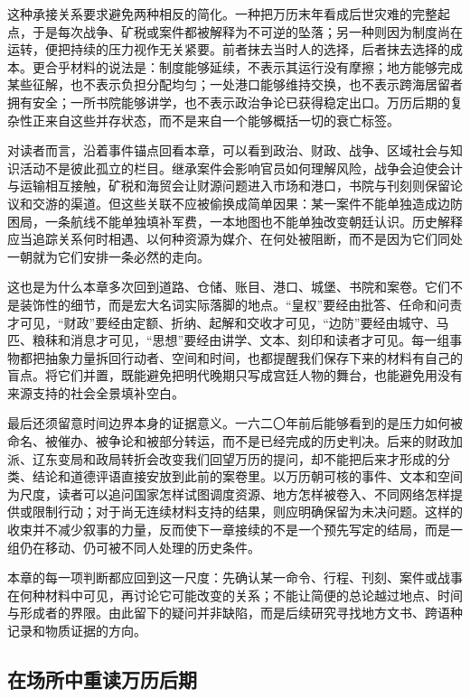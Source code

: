 这种承接关系要求避免两种相反的简化。一种把万历末年看成后世灾难的完整起点，于是每次战争、矿税或案件都被解释为不可逆的坠落；另一种则因为制度尚在运转，便把持续的压力视作无关紧要。前者抹去当时人的选择，后者抹去选择的成本。更合乎材料的说法是：制度能够延续，不表示其运行没有摩擦；地方能够完成某些征解，也不表示负担分配均匀；一处港口能够维持交换，也不表示跨海居留者拥有安全；一所书院能够讲学，也不表示政治争论已获得稳定出口。万历后期的复杂性正来自这些并存状态，而不是来自一个能够概括一切的衰亡标签。

对读者而言，沿着事件锚点回看本章，可以看到政治、财政、战争、区域社会与知识活动不是彼此孤立的栏目。继承案件会影响官员如何理解风险，战争会迫使会计与运输相互接触，矿税和海贸会让财源问题进入市场和港口，书院与刊刻则保留论议和交游的渠道。但这些关联不应被偷换成简单因果：某一案件不能单独造成边防困局，一条航线不能单独填补军费，一本地图也不能单独改变朝廷认识。历史解释应当追踪关系何时相遇、以何种资源为媒介、在何处被阻断，而不是因为它们同处一朝就为它们安排一条必然的走向。

这也是为什么本章多次回到道路、仓储、账目、港口、城堡、书院和案卷。它们不是装饰性的细节，而是宏大名词实际落脚的地点。“皇权”要经由批答、任命和问责才可见，“财政”要经由定额、折纳、起解和交收才可见，“边防”要经由城守、马匹、粮秣和消息才可见，“思想”要经由讲学、文本、刻印和读者才可见。每一组事物都把抽象力量拆回行动者、空间和时间，也都提醒我们保存下来的材料有自己的盲点。将它们并置，既能避免把明代晚期只写成宫廷人物的舞台，也能避免用没有来源支持的社会全景填补空白。


最后还须留意时间边界本身的证据意义。一六二〇年前后能够看到的是压力如何被命名、被催办、被争论和被部分转运，而不是已经完成的历史判决。后来的财政加派、辽东变局和政局转折会改变我们回望万历的提问，却不能把后来才形成的分类、结论和道德评语直接安放到此前的案卷里。以万历朝可核的事件、文本和空间为尺度，读者可以追问国家怎样试图调度资源、地方怎样被卷入、不同网络怎样提供或限制行动；对于尚无连续材料支持的结果，则应明确保留为未决问题。这样的收束并不减少叙事的力量，反而使下一章接续的不是一个预先写定的结局，而是一组仍在移动、仍可被不同人处理的历史条件。

本章的每一项判断都应回到这一尺度：先确认某一命令、行程、刊刻、案件或战事在何种材料中可见，再讨论它可能改变的关系；不能让简便的总论越过地点、时间与形成者的界限。由此留下的疑问并非缺陷，而是后续研究寻找地方文书、跨语种记录和物质证据的方向。

\subsection{在场所中重读万历后期}

